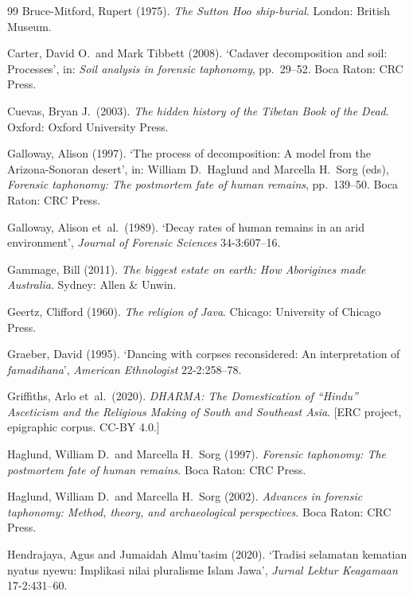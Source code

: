 \documentclass[12pt,a4paper]{article}
\begin{document}
\begin{thebibliography}{99}
Bruce-Mitford, Rupert (1975). \textit{The Sutton Hoo ship-burial}. London: British Museum.

Carter, David O.\ and Mark Tibbett (2008). `Cadaver decomposition and soil: Processes', in: \textit{Soil analysis in forensic taphonomy}, pp.\ 29--52. Boca Raton: CRC Press.

Cuevas, Bryan J.\ (2003). \textit{The hidden history of the Tibetan Book of the Dead}. Oxford: Oxford University Press.

Galloway, Alison (1997). `The process of decomposition: A model from the Arizona-Sonoran desert', in: William D.\ Haglund and Marcella H.\ Sorg (eds), \textit{Forensic taphonomy: The postmortem fate of human remains}, pp.\ 139--50. Boca Raton: CRC Press.

Galloway, Alison et~al.\ (1989). `Decay rates of human remains in an arid environment', \textit{Journal of Forensic Sciences} 34-3:607--16.

Gammage, Bill (2011). \textit{The biggest estate on earth: How Aborigines made Australia}. Sydney: Allen \& Unwin.

Geertz, Clifford (1960). \textit{The religion of Java}. Chicago: University of Chicago Press.

Graeber, David (1995). `Dancing with corpses reconsidered: An interpretation of \textit{famadihana}', \textit{American Ethnologist} 22-2:258--78.

Griffiths, Arlo et~al.\ (2020). \textit{DHARMA: The Domestication of ``Hindu'' Asceticism and the Religious Making of South and Southeast Asia}. [ERC project, epigraphic corpus. CC-BY 4.0.]

Haglund, William D.\ and Marcella H.\ Sorg (1997). \textit{Forensic taphonomy: The postmortem fate of human remains}. Boca Raton: CRC Press.

Haglund, William D.\ and Marcella H.\ Sorg (2002). \textit{Advances in forensic taphonomy: Method, theory, and archaeological perspectives}. Boca Raton: CRC Press.

Hendrajaya, Agus and Jumaidah Almu'tasim (2020). `Tradisi selamatan kematian nyatus nyewu: Implikasi nilai pluralisme Islam Jawa', \textit{Jurnal Lektur Keagamaan} 17-2:431--60.


\end{thebibliography}
\end{document}
